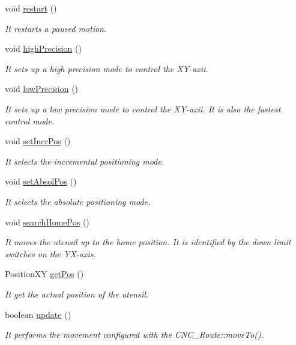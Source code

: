 \begin{DoxyCompactItemize}
void \hyperlink{class_c_n_c___router_ab36f29523c76dd9f64c1ab5367c8f3d3}{restart} ()
\begin{DoxyCompactList}\small\item\em It restarts a paused motion. \end{DoxyCompactList}\item 
void \hyperlink{class_c_n_c___router_ad82ea519e54f4ec488c10c150df26984}{high\+Precision} ()
\begin{DoxyCompactList}\small\item\em It sets up a high precision mode to control the X\+Y-\/axii. \end{DoxyCompactList}\item 
void \hyperlink{class_c_n_c___router_a15e3fab9eefaa7a61403c0054e643901}{low\+Precision} ()
\begin{DoxyCompactList}\small\item\em It sets up a low precision mode to control the X\+Y-\/axii. It is also the fastest control mode. \end{DoxyCompactList}\item 
void \hyperlink{class_c_n_c___router_abbda24db494dd328382639412570978e}{set\+Incr\+Pos} ()
\begin{DoxyCompactList}\small\item\em It selects the incremental positioning mode. \end{DoxyCompactList}\item 
void \hyperlink{class_c_n_c___router_a8629d6232f16d039ff386b0f02d45895}{set\+Absol\+Pos} ()
\begin{DoxyCompactList}\small\item\em It selects the absolute positioning mode. \end{DoxyCompactList}\item 
void \hyperlink{class_c_n_c___router_a4e9504d77eee555ddb35af073b67d3f1}{search\+Home\+Pos} ()
\begin{DoxyCompactList}\small\item\em It moves the utensil up to the home position. It is identified by the down limit switches on the Y\+X-\/axis. \end{DoxyCompactList}\item 
Position\+X\+Y \hyperlink{class_c_n_c___router_a177a7cc248cace9b84ae2b53d461cb6d}{get\+Pos} ()
\begin{DoxyCompactList}\small\item\em It get the actual position of the utensil. \end{DoxyCompactList}\item 
boolean \hyperlink{class_c_n_c___router_a3a8982d9582e2144d38791626b3060e6}{update} ()
\begin{DoxyCompactList}\small\item\em It performs the movement configured with the C\+N\+C\+\_\+\+Route\+::move\+To(). \end{DoxyCompactList}\end{DoxyCompactItemize}
